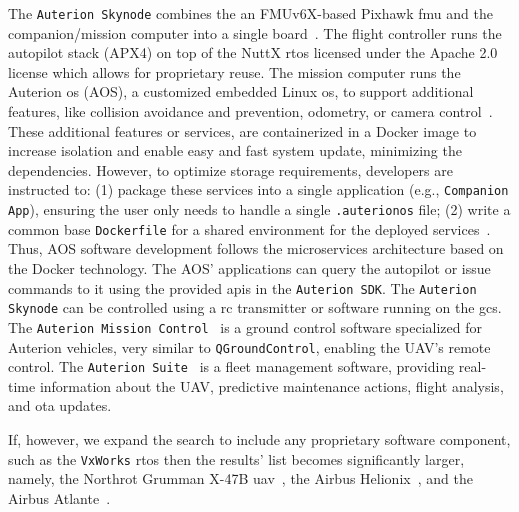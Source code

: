 The \lstinline{Auterion Skynode} combines the an FMUv6X-based Pixhawk
\gls{fmu} and the companion/mission computer into a single board~\cite{auterion-sw}. The flight
controller runs the autopilot stack (APX4) on top of the NuttX \gls{rtos}
licensed under the Apache 2.0 license which allows for proprietary reuse. The
mission computer runs the Auterion \gls{os} (AOS), a customized embedded Linux
\gls{os}, to support additional features, like collision avoidance and
prevention, odometry, or camera control~\cite{auterion-sw}. These additional features or services,
are containerized in a Docker image to increase isolation and enable easy and
fast system update, minimizing the dependencies. However, to optimize storage
requirements, developers are instructed to: (1) package these services into a
single application (e.g., \lstinline{Companion App}), ensuring the user only needs to handle a single
\lstinline{.auterionos} file; (2) write a common base \lstinline{Dockerfile} for
a shared environment for the deployed services~\cite{auterion-sw-services}. Thus, AOS software development
follows the microservices architecture based on the Docker technology.
The AOS' applications can query the autopilot or issue commands to it using the
provided \glspl{api} in the \lstinline{Auterion SDK}.
%
The \lstinline{Auterion Skynode} can be controlled using a \gls{rc} transmitter
or software running on the \gls{gcs}. The \lstinline{Auterion Mission Control}~\cite{auterion-missionControl}
is a ground control software specialized for Auterion vehicles, very similar to
\lstinline{QGroundControl}, enabling the UAV's remote control.
The \lstinline{Auterion Suite}~\cite{auterion-suite} is a fleet management software, providing
real-time information about the UAV, predictive maintenance actions, flight
analysis, and \gls{ota} updates.

If, however, we expand the search to include any proprietary
software component, such as the \lstinline{VxWorks} \gls{rtos} then the results'
list becomes significantly larger, namely, the Northrot Grumman X-47B
\gls{uav}~\cite{vxWorks-uav-northrop}, the Airbus
Helionix~\cite{vxWorks-uav-aribus-helionic}, and the Airbus
Atlante~\cite{vxWorks-uav-aribus-atlante}.
%


